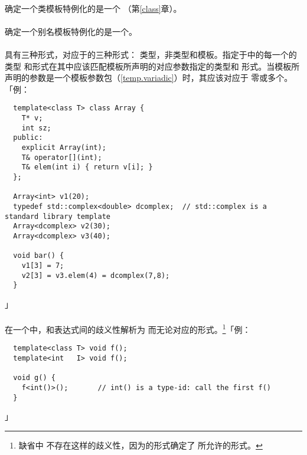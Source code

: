 \paragraph{}
确定一个类模板特例化的是一个
（第\ref{class}章）。

\paragraph{}
确定一个别名模板特例化的是一个。

\paragraph{}
具有三种形式，对应于的三种形式：
类型，非类型和模板。指定于中的每一个的类型
和形式在其中应该匹配模板所声明的对应参数指定的类型和
形式。当模板所声明的参数是一个模板参数包（\ref{temp.variadic}）时，其应该对应于
零或多个。「例：
\begin{lstlisting}
  template<class T> class Array {
    T* v;
    int sz;
  public:
    explicit Array(int);
    T& operator[](int);
    T& elem(int i) { return v[i]; }
  };

  Array<int> v1(20);
  typedef std::complex<double> dcomplex;  // std::complex is a standard library template
  Array<dcomplex> v2(30);
  Array<dcomplex> v3(40);

  void bar() {
    v1[3] = 7;
    v2[3] = v3.elem(4) = dcomplex(7,8);
  }
\end{lstlisting}」

\paragraph{}
在一个中，和表达式间的歧义性解析为
而无论对应的形式。\footnote{缺省中
不存在这样的歧义性，因为的形式确定了
所允许的形式。}「例：
\begin{lstlisting}
  template<class T> void f();
  template<int   I> void f();

  void g() {
    f<int()>();       // int() is a type-id: call the first f()
  }
\end{lstlisting}」

